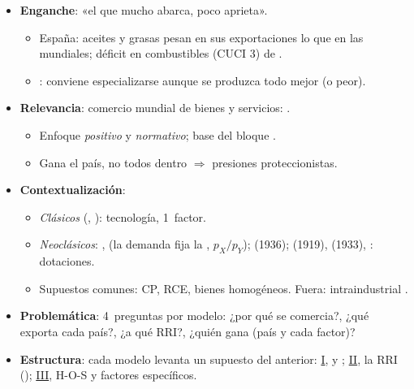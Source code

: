 \documentclass{article}
\begin{document}
\cabecerarepaso
\begin{columnas}

\begin{itemize}
\item \textbf{Enganche}: «el que mucho abarca, poco aprieta».
  \begin{itemize}
  \item España: aceites y grasas pesan en sus exportaciones  lo que en las mundiales; déficit en combustibles (CUCI 3) de .
  \item {}: conviene especializarse aunque se produzca todo mejor (o peor).
  \end{itemize}
\item \textbf{Relevancia}: comercio mundial de bienes y servicios: .
  \begin{itemize}
  \item Enfoque \emph{positivo} y \emph{normativo}; base del bloque    .
  \item Gana el país, no todos dentro $\Rightarrow$ presiones proteccionistas.
  \end{itemize}
\item \textbf{Contextualización}:
  \begin{itemize}
  \item \emph{Clásicos} (, ): tecnología, 1~factor.
  \item \emph{Neoclásicos}: ,  (la demanda fija la , $p_X/p_Y$);  (1936);  (1919),  (1933), : dotaciones.
  \item Supuestos comunes: CP, RCE, bienes homogéneos. Fuera: intraindustrial .
  \end{itemize}
\item \textbf{Problemática}: 4~preguntas por modelo: ¿por qué se comercia?, ¿qué exporta cada país?, ¿a qué RRI?, ¿quién gana (país y cada factor)?
\item \textbf{Estructura}: cada modelo levanta un supuesto del anterior: \hyperref[rep:I]{I},  y ; \hyperref[rep:II]{II}, la RRI (); \hyperref[rep:III]{III}, H-O-S y factores específicos.
\end{itemize}


\end{columnas}
\end{document}
